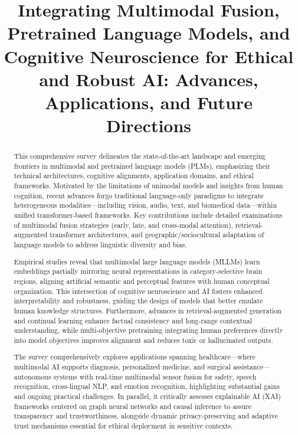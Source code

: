 \title{Integrating Multimodal Fusion, Pretrained Language Models, and Cognitive Neuroscience for Ethical and Robust AI: Advances, Applications, and Future Directions}
\maketitle

\begin{abstract}
This comprehensive survey delineates the state-of-the-art landscape and emerging frontiers in multimodal and pretrained language models (PLMs), emphasizing their technical architectures, cognitive alignments, application domains, and ethical frameworks. Motivated by the limitations of unimodal models and insights from human cognition, recent advances forgo traditional language-only paradigms to integrate heterogeneous modalities—including vision, audio, text, and biomedical data—within unified transformer-based frameworks. Key contributions include detailed examinations of multimodal fusion strategies (early, late, and cross-modal attention), retrieval-augmented transformer architectures, and geographic/sociocultural adaptation of language models to address linguistic diversity and bias.

Empirical studies reveal that multimodal large language models (MLLMs) learn embeddings partially mirroring neural representations in category-selective brain regions, aligning artificial semantic and perceptual features with human conceptual organization. This intersection of cognitive neuroscience and AI fosters enhanced interpretability and robustness, guiding the design of models that better emulate human knowledge structures. Furthermore, advances in retrieval-augmented generation and continual learning enhance factual consistency and long-range contextual understanding, while multi-objective pretraining integrating human preferences directly into model objectives improves alignment and reduces toxic or hallucinated outputs.

The survey comprehensively explores applications spanning healthcare—where multimodal AI supports diagnosis, personalized medicine, and surgical assistance—autonomous systems with real-time multimodal sensor fusion for safety, speech recognition, cross-lingual NLP, and emotion recognition, highlighting substantial gains and ongoing practical challenges. In parallel, it critically assesses explainable AI (XAI) frameworks centered on graph neural networks and causal inference to assure transparency and trustworthiness, alongside dynamic privacy-preserving and adaptive trust mechanisms essential for ethical deployment in sensitive contexts.


\end{abstract}
